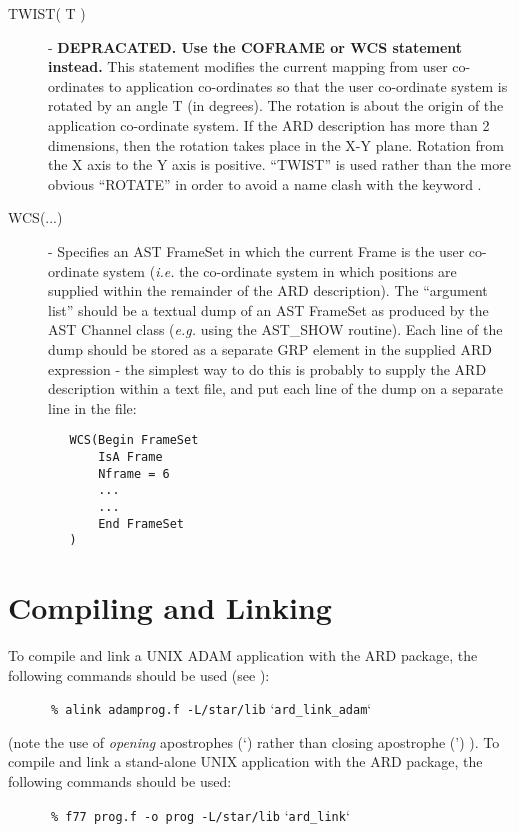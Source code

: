\begin{description}
\item [\label{ST:TWI}TWIST( T )] - {\bf DEPRACATED. Use the COFRAME or WCS statement instead.} This statement modifies the current mapping from user
co-ordinates to application co-ordinates so that the user co-ordinate system is
rotated by an angle T (in degrees). The rotation is about the origin of the
application co-ordinate system. If the ARD description has more than 2
dimensions, then the rotation takes place in the X-Y plane. Rotation from the X
axis to the Y axis is positive. ``TWIST'' is used rather than the more obvious
``ROTATE'' in order to avoid a name clash with the keyword
. 

\item [\label{ST:WCS}WCS(...)] - Specifies an AST FrameSet in which the
current Frame is the user co-ordinate system ({\em i.e.} the co-ordinate
system in which positions are supplied within the remainder of the ARD
description). The ``argument list'' should be a textual dump of an AST
FrameSet as produced by the AST Channel class ({\em e.g.} using the
AST\_SHOW routine). Each line of the dump should be stored as a separate
GRP element in the supplied ARD expression - the simplest way to do this
is probably to supply the ARD description within a text file, and put
each line of the dump on a separate line in the file:

\small
\begin{verbatim}
   WCS(Begin FrameSet 
       IsA Frame      
       Nframe = 6  
       ...
       ...
       End FrameSet
   )
\end{verbatim}
\normalsize

\end{description}

\section{Compiling and Linking}

To compile and link a UNIX ADAM application with the ARD package, the following
commands should be used (see ): 

\small
\verb#      % alink adamprog.f -L/star/lib# `\verb#ard_link_adam#`
\normalsize

(note the use of {\em opening} apostrophes (`) rather than 
closing apostrophe (') ). To compile and link a stand-alone UNIX application with
the ARD package, the following commands should be used: 

\small
\verb#      % f77 prog.f -o prog -L/star/lib# `\verb#ard_link#`
\normalsize

